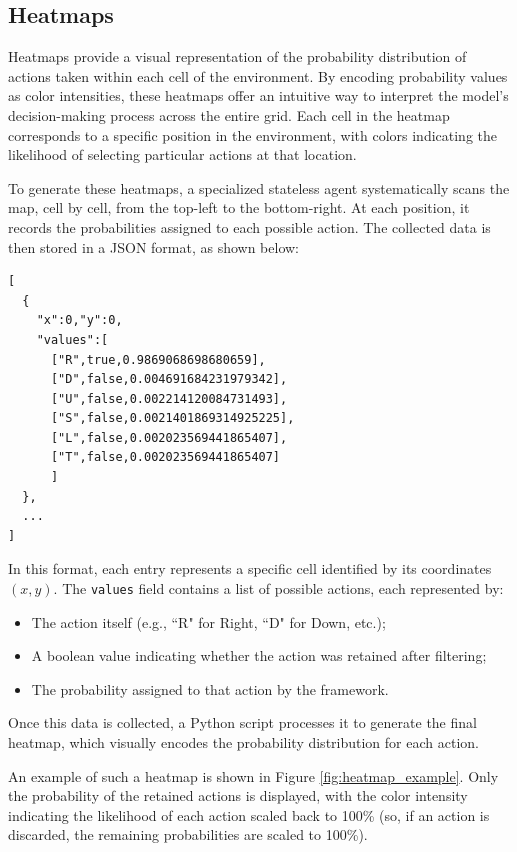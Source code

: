 \subsection{Heatmaps}

Heatmaps provide a visual representation of the probability distribution of
actions taken within each cell of the environment. By encoding probability values
as color intensities, these heatmaps offer an intuitive way to interpret the
model's decision-making process across the entire grid. Each cell in the heatmap
corresponds to a specific position in the environment, with colors indicating
the likelihood of selecting particular actions at that location.

To generate these heatmaps, a specialized stateless agent systematically scans the
map, cell by cell, from the top-left to the bottom-right. At each position, it records
the probabilities assigned to each possible action. The collected data is then
stored in a JSON format, as shown below:

\begin{verbatim}
[
  {
    "x":0,"y":0,
    "values":[
      ["R",true,0.9869068698680659],
      ["D",false,0.004691684231979342],
      ["U",false,0.002214120084731493],
      ["S",false,0.0021401869314925225],
      ["L",false,0.002023569441865407],
      ["T",false,0.002023569441865407]
      ]
  },
  ...
]
\end{verbatim}

In this format, each entry represents a specific cell identified by its coordinates
$(x,y)$. The \texttt{values} field contains a list of possible actions, each
represented by:
\begin{itemize}
  \item The action itself (e.g., ``R" for Right, ``D" for Down, etc.);

  \item A boolean value indicating whether the action was retained after filtering;

  \item The probability assigned to that action by the framework.
\end{itemize}
Once this data is collected, a Python script processes it to generate the final
heatmap, which visually encodes the probability distribution for each action.

An example of such a heatmap is shown in Figure \ref{fig:heatmap_example}. Only
the probability of the retained actions is displayed, with the color intensity indicating
the likelihood of each action scaled back to 100\% (so, if an action is
discarded, the remaining probabilities are scaled to 100\%).

